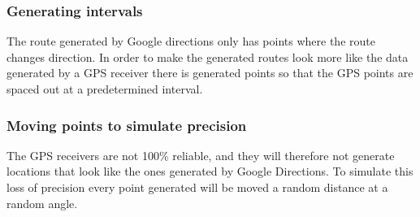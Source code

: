 \subsubsection{Generating intervals}
The route generated by Google directions only has points where the route changes direction.
In order to make the generated routes look more like the data generated by a GPS receiver there is generated points so that the GPS points are spaced out at a predetermined interval.

\subsubsection{Moving points to simulate precision}
The GPS receivers are not 100\% reliable, and they will therefore not generate locations that look like the ones generated by Google Directions.
To simulate this loss of precision every point generated will be moved a random distance at a random angle.
